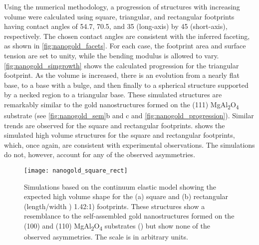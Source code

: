 Using the numerical methodology, a progression of structures with increasing volume were calculated using square, triangular, and rectangular footprints having contact angles of 54.7\degree, 70.5\degree, and 35\degree{} (long-axis) by 45\degree{} (short-axis), respectively.
The chosen contact angles are consistent with the inferred faceting, as shown in \cref{fig:nanogold_facets}.
For each case, the footprint area and surface tension are set to unity, while the bending modulus is allowed to vary.
\cref{fig:nanogold_simgrowth} shows the calculated progression for the triangular footprint.
As the volume is increased, there is an evolution from a nearly flat base, to a base with a bulge, and then finally to a spherical structure supported by a necked region to a triangular base.
These simulated structures are remarkably similar to the gold nanostructures formed on the (111) MgAl\textsubscript{2}O\textsubscript{4} substrate (see \cref{fig:nanogold_sem}b and c and \cref{fig:nanogold_progression}).
Similar trends are observed for the square and rectangular footprints.
 shows the simulated high volume structures for the square and rectangular footprints, which, once again, are consistent with experimental observations.
The simulations do not, however, account for any of the observed asymmetries.
\begin{figure}
 \centering \texttt{[image: nanogold\_square\_rect]}
 \caption[Simulations of square and rectangular base gold nanostructures]{\label{fig:nanogold_square_rect}Simulations based on the continuum elastic model showing the expected high volume shape for the (a) square and (b) rectangular (length/width ) 1.42:1) footprints.
  These structures show a resemblance to the self-assembled gold nanostructures formed on the (100) and (110) MgAl\textsubscript{2}O\textsubscript{4} substrates () but show none of the observed asymmetries.
  The scale is in arbitrary units.}
\end{figure}


